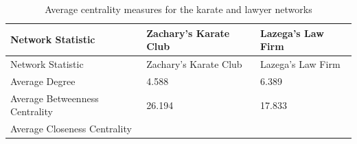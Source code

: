 \documentclass[12pt,twoside]{amherstthesis}
\begin{document}
  \begin{longtable}[]{@{}lll@{}}
  \caption{Average centrality measures for the karate and lawyer networks
  \label{tab:avgcent}}\tabularnewline
  \toprule
  \begin{minipage}[b]{0.36\columnwidth}\raggedright\strut
  Network Statistic\strut
  \end{minipage} & \begin{minipage}[b]{0.28\columnwidth}\raggedright\strut
  Zachary's Karate Club\strut
  \end{minipage} & \begin{minipage}[b]{0.28\columnwidth}\raggedright\strut
  Lazega's Law Firm\strut
  \end{minipage}\tabularnewline
  \midrule
  \endfirsthead
  \toprule
  \begin{minipage}[b]{0.36\columnwidth}\raggedright\strut
  Network Statistic\strut
  \end{minipage} & \begin{minipage}[b]{0.28\columnwidth}\raggedright\strut
  Zachary's Karate Club\strut
  \end{minipage} & \begin{minipage}[b]{0.28\columnwidth}\raggedright\strut
  Lazega's Law Firm\strut
  \end{minipage}\tabularnewline
  \midrule
  \endhead
  \begin{minipage}[t]{0.36\columnwidth}\raggedright\strut
  Average Degree\strut
  \end{minipage} & \begin{minipage}[t]{0.28\columnwidth}\raggedright\strut
  4.588\strut
  \end{minipage} & \begin{minipage}[t]{0.28\columnwidth}\raggedright\strut
  6.389\strut
  \end{minipage}\tabularnewline
  \begin{minipage}[t]{0.36\columnwidth}\raggedright\strut
  Average Betweenness Centrality\strut
  \end{minipage} & \begin{minipage}[t]{0.28\columnwidth}\raggedright\strut
  26.194\strut
  \end{minipage} & \begin{minipage}[t]{0.28\columnwidth}\raggedright\strut
  17.833\strut
  \end{minipage}\tabularnewline
  \begin{minipage}[t]{0.36\columnwidth}\raggedright\strut
  Average Closeness Centrality\strut
  \end{minipage} & \begin{minipage}[t]{0.28\columnwidth}\raggedright\strut

\end{minipage}
\end{longtable}
\end{document}
